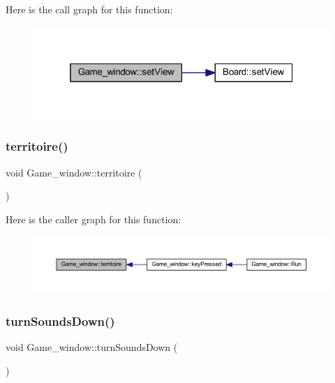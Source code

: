 Here is the call graph for this function\+:
\nopagebreak
\begin{figure}[H]
\begin{center}
\leavevmode
\includegraphics[width=319pt]{class_game__window_a5d130eb03ee63de5d63f91bcf6c56fa5_cgraph}
\end{center}
\end{figure}
\mbox{\label{class_game__window_a8ad36b6ebe4760954dd01e94fc5762f1}} 
\subsubsection{\texorpdfstring{territoire()}{territoire()}}
{\footnotesize\ttfamily void Game\+\_\+window\+::territoire (\begin{DoxyParamCaption}{ }\end{DoxyParamCaption})}

Here is the caller graph for this function\+:
\nopagebreak
\begin{figure}[H]
\begin{center}
\leavevmode
\includegraphics[width=350pt]{class_game__window_a8ad36b6ebe4760954dd01e94fc5762f1_icgraph}
\end{center}
\end{figure}
\mbox{\label{class_game__window_aa934e0cb8983cf30af634deff8581848}} 
\subsubsection{\texorpdfstring{turn\+Sounds\+Down()}{turnSoundsDown()}}
{\footnotesize\ttfamily void Game\+\_\+window\+::turn\+Sounds\+Down (\begin{DoxyParamCaption}{ }\end{DoxyParamCaption})}


